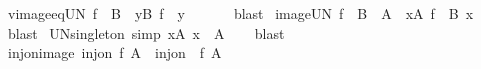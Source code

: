 \begin{isabellebody}
%
\endisadelimproof
\isanewline
{}\isamarkupfalse%
\ vimage{\isacharunderscore}{\kern0pt}eq{\isacharunderscore}{\kern0pt}UN{\isacharcolon}{\kern0pt}\ {\isachardoublequoteopen}f\ {\isacharminus}{\kern0pt}{\isacharbackquote}{\kern0pt}\ B\ {\isacharequal}{\kern0pt}\ {\isacharparenleft}{\kern0pt}{\isasymUnion}y{\isasymin}B{\isachardot}{\kern0pt}\ f\ {\isacharminus}{\kern0pt}{\isacharbackquote}{\kern0pt}\ {\isacharbraceleft}{\kern0pt}y{\isacharbraceright}{\kern0pt}{\isacharparenright}{\kern0pt}{\isachardoublequoteclose}\isanewline
\ \ %
\isanewline
%
\isadelimproof
\ \ %
\endisadelimproof
%
\isatagproof
{}\isamarkupfalse%
\ blast%
\endisatagproof
{\isafoldproof}%
%
\isadelimproof
\isanewline
%
\endisadelimproof
\isanewline
{}\isamarkupfalse%
\ image{\isacharunderscore}{\kern0pt}UN{\isacharcolon}{\kern0pt}\ {\isachardoublequoteopen}f\ {\isacharbackquote}{\kern0pt}\ {\isasymUnion}{\isacharparenleft}{\kern0pt}B\ {\isacharbackquote}{\kern0pt}\ A{\isacharparenright}{\kern0pt}\ {\isacharequal}{\kern0pt}\ {\isacharparenleft}{\kern0pt}{\isasymUnion}x{\isasymin}A{\isachardot}{\kern0pt}\ f\ {\isacharbackquote}{\kern0pt}\ B\ x{\isacharparenright}{\kern0pt}{\isachardoublequoteclose}\isanewline
%
\isadelimproof
\ \ %
\endisadelimproof
%
\isatagproof
{}\isamarkupfalse%
\ blast%
\endisatagproof
{\isafoldproof}%
%
\isadelimproof
\isanewline
%
\endisadelimproof
\isanewline
{}\isamarkupfalse%
\ UN{\isacharunderscore}{\kern0pt}singleton\ {\isacharbrackleft}{\kern0pt}simp{\isacharbrackright}{\kern0pt}{\isacharcolon}{\kern0pt}\ {\isachardoublequoteopen}{\isacharparenleft}{\kern0pt}{\isasymUnion}x{\isasymin}A{\isachardot}{\kern0pt}\ {\isacharbraceleft}{\kern0pt}x{\isacharbraceright}{\kern0pt}{\isacharparenright}{\kern0pt}\ {\isacharequal}{\kern0pt}\ A{\isachardoublequoteclose}\isanewline
%
\isadelimproof
\ \ %
\endisadelimproof
%
\isatagproof
{}\isamarkupfalse%
\ blast%
\endisatagproof
{\isafoldproof}%
%
\isadelimproof
\isanewline
%
\endisadelimproof
\isanewline
{}\isamarkupfalse%
\ inj{\isacharunderscore}{\kern0pt}on{\isacharunderscore}{\kern0pt}image{\isacharcolon}{\kern0pt}\ {\isachardoublequoteopen}inj{\isacharunderscore}{\kern0pt}on\ f\ {\isacharparenleft}{\kern0pt}{\isasymUnion}A{\isacharparenright}{\kern0pt}\ {\isasymLongrightarrow}\ inj{\isacharunderscore}{\kern0pt}on\ {\isacharparenleft}{\kern0pt}{\isacharparenleft}{\kern0pt}{\isacharbackquote}{\kern0pt}{\isacharparenright}{\kern0pt}\ f{\isacharparenright}{\kern0pt}\ A{\isachardoublequoteclose}\isanewline

\end{isabellebody}
